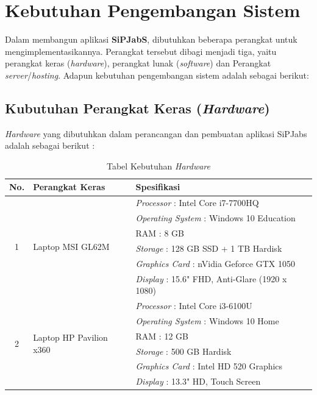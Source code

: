\section{Kebutuhan Pengembangan Sistem}

Dalam membangun aplikasi \textbf{SiPJabS}, dibutuhkan beberapa perangkat untuk mengimplementasikannya. Perangkat tersebut dibagi menjadi tiga, yaitu perangkat keras (\textit{hardware}), perangkat lunak (\textit{software}) dan Perangkat \textit{server}/\textit{hosting}. Adapun kebutuhan pengembangan sistem adalah sebagai berikut: 

\subsection{Kubutuhan Perangkat Keras (\textit{Hardware}) }

\textit{Hardware} yang dibutuhkan dalam perancangan dan pembuatan aplikasi SiPJabs
adalah sebagai berikut :


\begin{table}[H]
	\centering
	\caption{Tabel Kebutuhan \textit{Hardware}}
	\begin{tabular}{ | c | l | p{75mm} | }
		\hline
		No. & Perangkat Keras & Spesifikasi \\
		\hline
		\multirow{6}{*}{1} & \multirow{6}{*}{Laptop MSI GL62M} & \textit{Processor} : Intel Core i7-7700HQ \\
		& & \textit{Operating System} : Windows 10 Education \\
		& & RAM : 8 GB \\
		& & \textit{Storage} : 128 GB SSD + 1 TB Hardisk \\
		& & \textit{Graphics Card} :  nVidia Geforce GTX 1050 \\
		& & \textit{Display} : 15.6" FHD, Anti-Glare (1920 x 1080) \\
		
		
		\hline
		
		\multirow{6}{*}{2} & \multirow{6}{*}{Laptop HP Pavilion x360} & \textit{Processor} : Intel Core i3-6100U \\
		& & \textit{Operating System} : Windows 10 Home \\
		& & RAM : 12 GB \\
		& & \textit{Storage} : 500 GB Hardisk\\
		& & \textit{Graphics Card} : Intel HD 520 Graphics \\
		& & \textit{Display} : 13.3" HD, Touch Screen \\
		
		\hline
	\end{tabular}
\end{table}


